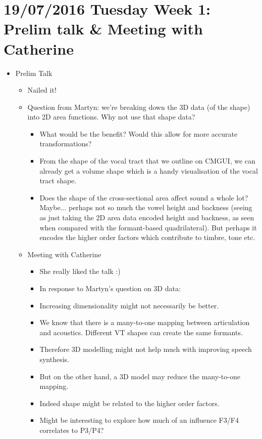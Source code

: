 \documentclass{article}
\begin{document}
\section*{19/07/2016 Tuesday Week 1: Prelim talk \& Meeting with Catherine}
\begin{itemize}
    \item Prelim Talk
    \begin{itemize}
        \item Nailed it!
        \item Question from Martyn: we're breaking down the 3D data (of the shape) into 2D area functions. Why not use that shape data?
        \begin{itemize}
            \item What would be the benefit? Would this allow for more accurate transformations?
            \item From the shape of the vocal tract that we outline on CMGUI, we can already get a volume shape which is a handy visualisation of the vocal tract shape.
            \item Does the shape of the cross-sectional area affect sound a whole lot? Maybe... perhaps not so much the vowel height and backness (seeing as just taking the 2D area data encoded height and backness, as seen when compared with the formant-based quadrilateral). But perhaps it encodes the higher order factors which contribute to timbre, tone etc.
        \end{itemize}
        \item Meeting with Catherine
        \begin{itemize}
            \item She really liked the talk :) 
            \item In response to Martyn's question on 3D data:          \item Increasing dimensionality might not necessarily be better.
            \item We know that there is a many-to-one mapping between articulation and acoustics. Different VT shapes can create the same formants.
            \item Therefore 3D modelling might not help much with improving speech synthesis.
            \item But on the other hand, a 3D model may reduce the many-to-one mapping.
            \item Indeed shape might be related to the higher order factors.
            \item Might be interesting to explore how much of an influence F3/F4 correlates to P3/P4?

\end{itemize}
\end{itemize}
\end{itemize}
\end{document}
